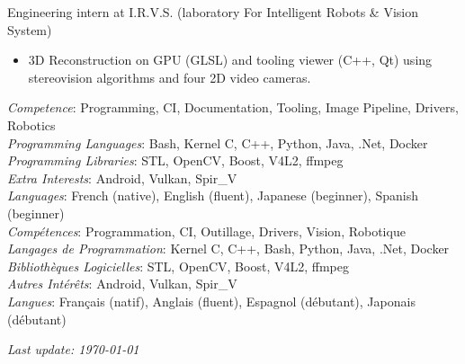 \documentclass{article}
\begin{document}
\begin{llist}
 {
Engineering intern at I.R.V.S. (laboratory For Intelligent Robots \& Vision System)
\vspace{-0.33cm}
\begin{itemize}
\item 3D Reconstruction on GPU (GLSL) and tooling viewer (C++, Qt) using stereovision algorithms and four 2D video cameras.
\end{itemize}
} {}

 {
{\em Competence}: Programming, CI, Documentation, Tooling, Image Pipeline, Drivers, Robotics \\
{\em Programming Languages}: Bash, Kernel C, C++, Python, Java, .Net, Docker \\
{\em Programming Libraries}: STL, OpenCV, Boost, V4L2, ffmpeg \\
{\em Extra Interests}: Android, Vulkan, Spir_V \\
{\em Languages}: French (native), English (fluent), Japanese (beginner), Spanish (beginner) \\
} {
{\em Comp\'{e}tences}: Programmation, CI, Outillage, Drivers, Vision, Robotique \\
{\em Langages de Programmation}: Kernel C, C++, Bash, Python, Java, .Net, Docker \\
{\em Biblioth\`{e}ques Logicielles}: STL, OpenCV, Boost, V4L2, ffmpeg \\
{\em Autres Int\'{e}r\^{e}ts}: Android, Vulkan, Spir_V \\
{\em Langues}: Fran\c{c}ais (natif), Anglais (fluent), Espagnol (d\'{e}butant), Japonais (d\'{e}butant) \\
}


\end{llist}

{\em Last update: \today}
\end{document}
